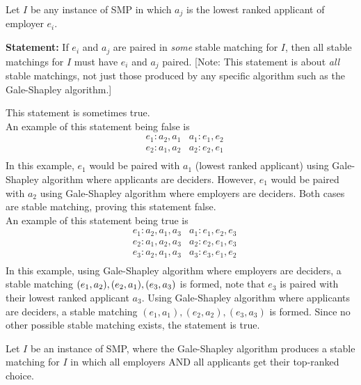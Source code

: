 \documentclass[11pt,fleqn]{exam}
\newif\ifsolutions\solutionsfalse
\newenvironment{soln}{\color{solnblue}}{}
\begin{document}
\begin{questions}
\question[2]
  Let $I$ be any instance of SMP in which $a_j$ is the lowest ranked applicant of employer $e_i$. 

\noindent
    {\bf Statement:} If $e_i$ and $a_j$ are paired in {\em some} stable matching for $I$, then all stable matchings for $I$ must have $e_i$ and $a_j$ paired. [Note: This statement is about {\em all} stable matchings, not just those produced by any specific algorithm such as the Gale-Shapley algorithm.]

    \begin{soln}
    This statement is sometimes true. \\
        An example of this statement being false is
        \begin{align*}
            & e_1: a_2, a_1 & a_1: e_1, e_2  \\
            & e_2: a_1, a_2 & a_2: e_2, e_1  \\
        \end{align*}
        In this example, $e_1$ would be paired with $a_1$ (lowest ranked applicant) using Gale-Shapley algorithm where applicants are deciders. However, $e_1$ would be paired with $a_2$ using Gale-Shapley algorithm where employers are deciders. Both cases are stable matching, proving this statement false.
        \\
        An example of this statement being true is
        \begin{align*}
            & e_1: a_2, a_1, a_3 & a_1: e_1, e_2, e_3  \\
            & e_2: a_1, a_2, a_3 & a_2: e_2, e_1, e_3  \\
            & e_3: a_2, a_1, a_3 & a_3: e_3, e_1, e_2  \\
        \end{align*}
        In this example, using Gale-Shapley algorithm where employers are deciders, a stable matching $(e_1, a_2), \\ (e_2, a_1), (e_3, a_3)$ is formed, note that $e_3$ is paired with their lowest ranked applicant $a_3$. Using Gale-Shapley algorithm where applicants are deciders, a stable matching $(e_1, a_1), (e_2, a_2), (e_3, a_3)$ is formed. Since no other possible stable matching exists, the statement is true.
    \end{soln}
    \ifsolutions
     
    \else
    \fi
    
\question[2]
Let $I$ be an instance of SMP, where the Gale-Shapley algorithm produces a stable matching for $I$ in which all employers AND all applicants get their top-ranked choice. 


\end{questions}
\end{document}
